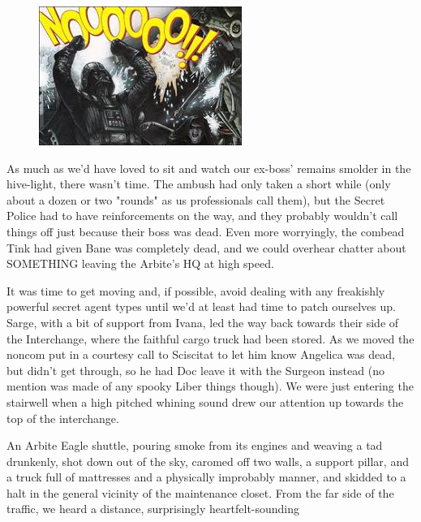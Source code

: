 \begin{figure}
	\begin{center}
		\includegraphics[width=\figwidth]{pics/19/46.png}
	\end{center}
\end{figure}
As much as we'd have loved to sit and watch our ex-boss' remains smolder in the hive-light, there wasn't time. 
The ambush had only taken a short while (only about a dozen or two "rounds" as us professionals call them), but the Secret Police had to have reinforcements on the way, and they probably wouldn't call things off just because their boss was dead. 
Even more worryingly, the combead Tink had given Bane was completely dead, and we could overhear chatter about SOMETHING leaving the Arbite's HQ at high speed.

It was time to get moving and, if possible, avoid dealing with any freakishly powerful secret agent types until we'd at least had time to patch ourselves up. 
Sarge, with a bit of support from Ivana, led the way back towards their side of the Interchange, where the faithful cargo truck had been stored. 
As we moved the noncom put in a courtesy call to Sciscitat to let him know Angelica was dead, but didn't get through, so he had Doc leave it with the Surgeon instead (no mention was made of any spooky Liber things though). 
We were just entering the stairwell when a high pitched whining sound drew our attention up towards the top of the interchange.

An Arbite Eagle shuttle, pouring smoke from its engines and weaving a tad drunkenly, shot down out of the sky, caromed off two walls, a support pillar, and a truck full of mattresses and a physically improbably manner, and skidded to a halt in the general vicinity of the maintenance closet. 
From the far side of the traffic, we heard a distance, surprisingly heartfelt-sounding





